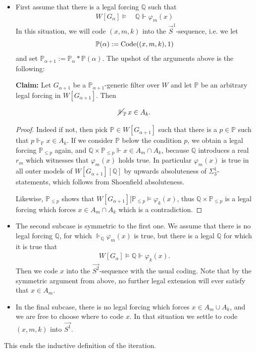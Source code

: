 \documentclass[a4paper,11pt]{article}
\newcommand{\forceP}{\mathbb{P}}
\newcommand{\forceQ}{\mathbb{Q}}
\begin{document}
\begin{itemize}
\item[(i)] First assume that there is a legal forcing $\forceQ$ such that
\begin{align*}
W[G_{\alpha}] \models &\, \forceQ \Vdash \varphi_m(x) 
\end{align*}
In this situation, we will code $(x,m,k)$ into the $\vec{S}^1$-sequence, i.e. we
let \[ \forceP(\alpha):= \hbox{Code} ((x,m,k),1) \]
and set $\forceP_{\alpha+1}:=\forceP_{\alpha} \ast \forceP(\alpha)$.
The upshot of the arguments above is the following:

 \begin{flushleft}
\textbf{Claim:} Let $G_{\alpha+1}$ be a $\forceP_{\alpha+1}$-generic filter over $W$ and let $\forceP$ be an arbitrary legal forcing in $W[G_{\alpha+1}]$. Then
\end{flushleft}
\[ \cancel{\Vdash}_{\forceP} \, x \in A_k.\]
\begin{proof}
Indeed if not, then pick $\forceP \in W[G_{\alpha+1}]$ such that there is a $p \in \forceP$ such that $p \Vdash_{\forceP} x \in A_k$. If we consider $\forceP$ below the condition $p$, we obtain a legal forcing $\forceP_{ \le p}$ again, and 
$\forceQ \times \forceP_{\le p} \Vdash x \in A_m  \cap A_k$, because $\forceQ$ introduces a real $r_m$ which witnesses that $\varphi_m(x)$ holds true. In particular $\varphi_m(x)$ is true in all outer models of $W[G_{\alpha+1}] [\forceQ]$ by upwards absoluteness of $\Sigma^1_3$-statements, which follows from Shoenfield absoluteness.

Likewise, $\forceP_{\le p}$ shows that $W[G_{\alpha+1}] [\forceP_{ \le p} \models \varphi_k (x)$, thus $\forceQ \times \forceP_{\le p}$ is a legal forcing which forces $x \in A_m \cap A_k$ which is a contradiction.
\end{proof}
\item[(ii)] The second subcase is symmetric to the first one. We assume that there is no legal forcing $\forceQ$, for which $\Vdash_{\forceQ} \varphi_m(x)$ is true, but there is a legal $\forceQ$ for which it is true that
\begin{align*}
W[G_{\alpha}] \models 
\forceQ \Vdash  \varphi_k(x). 
\end{align*}
Then we code $x$ into the $\vec{S^2}$-sequence with the usual coding. Note that by the symmetric argument from above, no further legal extension will ever satisfy that $x \in A_m$.
\item[(iii)] In the final subcase, there is no legal forcing which forces $x \in A_m \cup A_k$, and we are free to choose where to code $x$.
In that situation we settle to  code $(x,m,k)$ into $\vec{S^1}$.
\end{itemize}
This ends the inductive definition of the iteration.
\end{document}
